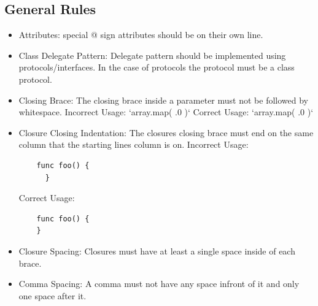 \documentclass[12pt]{article}
\begin{document}
  \subsection{General Rules}
  \begin{itemize}
  \item Attributes:\newline
    special @ sign attributes should be on their own line. \newline
     \newline
  \item Class Delegate Pattern:\newline
    Delegate pattern should be implemented using protocols/interfaces. In the case of protocols \newline
    the protocol must be a class protocol. \newline
     \newline
  \item Closing Brace:\newline
    The closing brace inside a parameter must not be followed by whitespace. \newline
    Incorrect Usage: `array.map({ .0 }  )` \newline
    Correct Usage: `array.map({ .0 })` \newline
     \newline
  \item Closure Closing Indentation:\newline
    The closures closing brace must end on the same column that the starting lines column is on. \newline
    Incorrect Usage: \newline
    \begin{verbatim}
    func foo() {
      }
    \end{verbatim}
    Correct Usage: \newline
    \begin{verbatim}
    func foo() {
    }
    \end{verbatim}
  \item Closure Spacing:\newline
    Closures must have at least a single space inside of each brace. \newline
     \newline
  \item Comma Spacing:\newline
    A comma must not have any space infront of it and only one space after it. \newline

\end{itemize}
\end{document}
